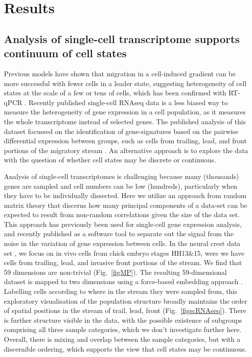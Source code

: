 \documentclass[review]{elsarticle}
\begin{document}
\section{Results}
\subsection{Analysis of single-cell transcriptome supports continuum of cell states}
Previous models have shown that migration in a cell-induced gradient can be more successful with fewer cells in a leader state, suggesting heterogeneity of cell states at the scale of a few or tens of cells, which has been confirmed with RT-qPCR \cite{McLennan2015}. Recently published single-cell RNAseq data \cite{Morrison2017} is a less biased way to measure the heterogeneity of gene expression in a cell population, as it measures the whole transcriptome instead of selected genes. The published analysis of this dataset focussed on the identification of gene-signatures based on the pairwise differential expression between groups, such as cells from trailing, lead, and front portions of the migratory stream \cite{Morrison2017}. An alternative approach is to explore the data with the question of whether cell states may be discrete or continuous.

Analysis of single-cell transcriptomes is challenging because many (thousands) genes are sampled and cell numbers can be low (hundreds), particularly when they have to be individually dissected. Here we utilize an approach from random matrix theory that discerns how many principal components of a data-set can be expected to result from non-random correlations given the size of the data set. This approach has previously been used for single-cell gene expression analysis\cite{Klein2015a}, and recently published as a software tool \cite{Aparicio2018} to separate out the signal from the noise in the variation of gene expression between cells. In the neural crest data set \cite{Morrison2017}, we focus on in vivo cells from chick embryo stages HH13\&15, were we have cells from trailing, lead, and invasive front portions of the stream. We find that 59 dimensions are non-trivial (Fig.~\ref{figMP}). The resulting 59-dimensional dataset is mapped to two dimensions using a force-based embedding approach \cite{Weinreb2018}. Labelling cells according to where in the stream they were sampled from, this exploratory visualisation of the population structure broadly maintains the order of spatial positions in the stream of trail, lead, front (Fig.~\ref{figscRNAseq}). There is further structure visible in the data, with the possible existence of subgroups comprising all three sample categories, which we don't investigate further here. Overall, there is mixing and overlap between the sample categories, but with a discernible ordering, which supports the view that cell states may be continuous.
\end{document}
